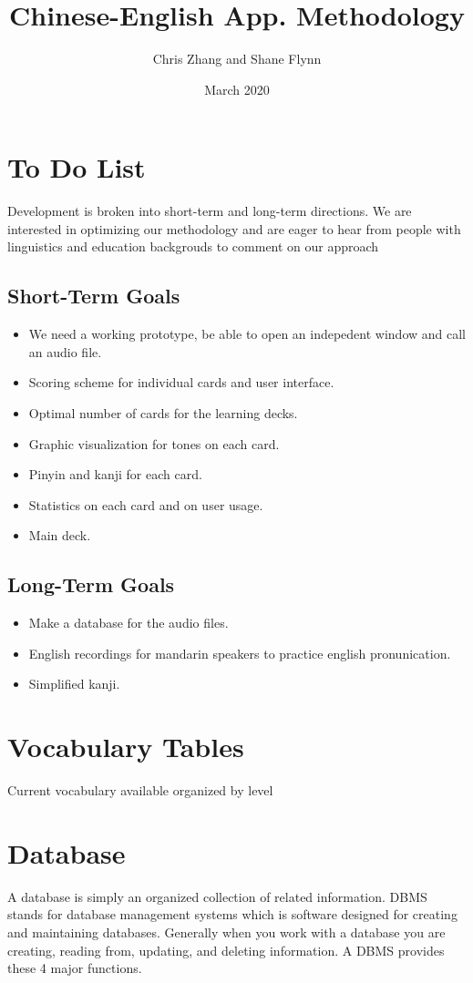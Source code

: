\documentclass{article}
\title{Chinese-English App. Methodology}
\author{Chris Zhang and Shane Flynn}
\date{March 2020}
\begin{document}
\section*{To Do List}
Development is broken into short-term and long-term directions.
We are interested in optimizing our methodology and are eager to hear from
people with linguistics and education backgrouds to comment on our approach

\subsection*{Short-Term Goals}
\begin{itemize}
  \item  We need a working prototype, be able to open an indepedent window and
  call an audio file.
  \item Scoring scheme for individual cards and user interface.
  \item Optimal number of cards for the learning decks.
  \item Graphic visualization for tones on each card.
  \item Pinyin and kanji for each card.
  \item Statistics on each card and on user usage.
  \item Main deck.
\end{itemize}

\subsection*{Long-Term Goals}
\begin{itemize}
  \item Make a database for the audio files.
  \item English recordings for mandarin speakers to practice english
  pronunication.
  \item Simplified kanji.
\end{itemize}

\section*{Vocabulary Tables}
Current vocabulary available organized by level

\section*{Database}
A database is simply an organized collection of related information.
DBMS stands for database management systems which is software designed for
creating and maintaining databases.
Generally when you work with a database you are creating, reading from, updating,
and deleting information.
A DBMS provides these 4 major functions.
\end{document}
